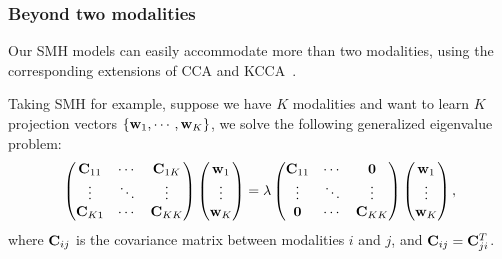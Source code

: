 \subsubsection{Beyond two modalities}
\label{smh:Ssmh:EXT:BEYOND}

Our \mbox{SMH} models can easily accommodate more than two modalities, using the corresponding extensions of \mbox{CCA} and \mbox{KCCA}~\cite{hardoon2004nc}\cite{blaschko2008ecml}.

Taking \mbox{SMH} for example, suppose we have $ K $ modalities and want to learn $ K $ projection vectors $ \{{\bf w}_1,\cdots,{\bf w}_K\}$, we solve the following generalized eigenvalue problem:
\begin{align}
\begin{pmatrix}
{\bf C}_{11} & \cdots &{\bf C}_{1K} \\
\vdots & \ddots &\vdots \\
{\bf C}_{K1}&\cdots &{\bf C}_{KK} \end{pmatrix}\begin{pmatrix}{\bf w}_1\\\vdots\\{\bf w}_K\end{pmatrix} = \lambda  \begin{pmatrix}
{\bf C}_{11} & \cdots &{\bf 0} \\
\vdots & \ddots &\vdots \\
{\bf 0}&\cdots &{\bf C}_{KK} \end{pmatrix}\begin{pmatrix}
{\bf w}_{1}\\
\vdots \\
{\bf w}_{K}\end{pmatrix},\nonumber
\end{align} 
where $ {\bf C}_{ij} $ is the covariance matrix between modalities $ i $ and $ j $, and $  {\bf C}_{ij} = {\bf C}_{ji}^T  $.

